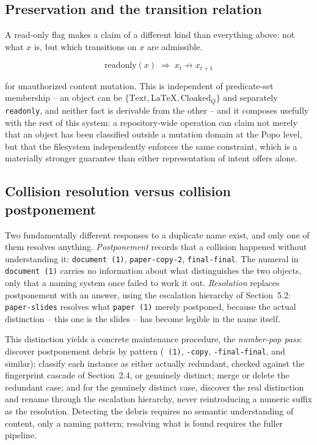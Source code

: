 \documentclass[11pt]{article}
\begin{document}
\subsection{Preservation and the transition relation}

A read-only flag makes a claim of a different kind than everything above: not what $x$ is, but which transitions on $x$ are admissible.

\begin{equation}
\mathrm{readonly}(x) \;\Rightarrow\; x_t \not\rightarrow x_{t+1}
\end{equation}

for unauthorized content mutation. This is independent of predicate-set membership -- an object can be $\{\mathrm{Text}, \mathrm{LaTeX}, \mathrm{Cloaked}_Q\}$ and separately \texttt{readonly}, and neither fact is derivable from the other -- and it composes usefully with the rest of this system: a repository-wide operation can claim not merely that an object has been classified outside a mutation domain at the Popo level, but that the filesystem independently enforces the same constraint, which is a materially stronger guarantee than either representation of intent offers alone.

\subsection{Collision resolution versus collision postponement}

Two fundamentally different responses to a duplicate name exist, and only one of them resolves anything. \emph{Postponement} records that a collision happened without understanding it: \texttt{document (1)}, \texttt{paper-copy-2}, \texttt{final-final}. The numeral in \texttt{document (1)} carries no information about what distinguishes the two objects, only that a naming system once failed to work it out. \emph{Resolution} replaces postponement with an answer, using the escalation hierarchy of Section~5.2: \texttt{paper-slides} resolves what \texttt{paper (1)} merely postponed, because the actual distinction -- this one is the slides -- has become legible in the name itself.

This distinction yields a concrete maintenance procedure, the \emph{number-pop pass}: discover postponement debris by pattern (\texttt{ (1)}, \texttt{-copy}, \texttt{-final-final}, and similar); classify each instance as either actually redundant, checked against the fingerprint cascade of Section~2.4, or genuinely distinct; merge or delete the redundant case; and for the genuinely distinct case, discover the real distinction and rename through the escalation hierarchy, never reintroducing a numeric suffix as the resolution. Detecting the debris requires no semantic understanding of content, only a naming pattern; resolving what is found requires the fuller pipeline.
\end{document}
